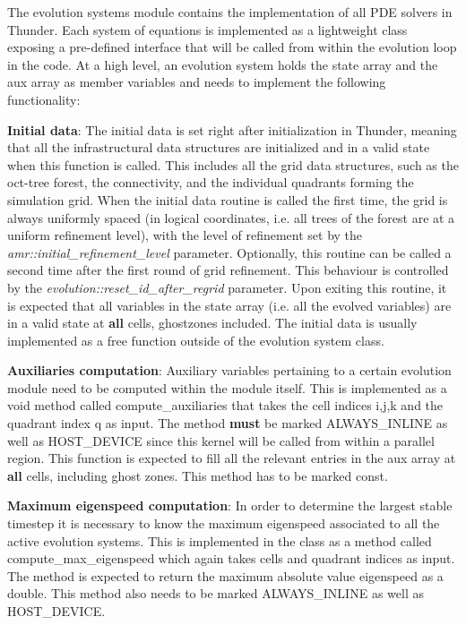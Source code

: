 The evolution systems module contains the implementation of all PDE solvers in Thunder. Each system of equations is implemented as a lightweight class exposing a pre-\/defined interface that will be called from within the evolution loop in the code. At a high level, an evolution system holds the {\ttfamily state} array and the {\ttfamily aux} array as member variables and needs to implement the following functionality\+:
\begin{DoxyItemize}
\item {\bfseries{Initial data}}\+: The initial data is set right after initialization in Thunder, meaning that all the infrastructural data structures are initialized and in a valid state when this function is called. This includes all the grid data structures, such as the oct-\/tree forest, the connectivity, and the individual quadrants forming the simulation grid. When the initial data routine is called the first time, the grid is always uniformly spaced (in logical coordinates, i.\+e. all trees of the forest are at a uniform refinement level), with the level of refinement set by the {\itshape amr\+::initial\+\_\+refinement\+\_\+level} parameter. Optionally, this routine can be called a second time after the first round of grid refinement. This behaviour is controlled by the {\itshape evolution\+::reset\+\_\+id\+\_\+after\+\_\+regrid} parameter. Upon exiting this routine, it is expected that all variables in the {\ttfamily state} array (i.\+e. all the evolved variables) are in a valid state at {\bfseries{all}} cells, ghostzones included. The initial data is usually implemented as a free function outside of the evolution system class.
\item {\bfseries{Auxiliaries computation}}\+: Auxiliary variables pertaining to a certain evolution module need to be computed within the module itself. This is implemented as a {\ttfamily void} method called {\ttfamily compute\+\_\+auxiliaries} that takes the cell indices {\ttfamily i,j,k} and the quadrant index {\ttfamily q} as input. The method {\bfseries{must}} be marked {\ttfamily ALWAYS\+\_\+\+INLINE} as well as {\ttfamily HOST\+\_\+\+DEVICE} since this kernel will be called from within a parallel region. This function is expected to fill all the relevant entries in the {\ttfamily aux} array at {\bfseries{all}} cells, including ghost zones. This method has to be marked {\ttfamily const}.
\item {\bfseries{Maximum eigenspeed computation}}\+: In order to determine the largest stable timestep it is necessary to know the maximum eigenspeed associated to all the active evolution systems. This is implemented in the class as a method called {\ttfamily compute\+\_\+max\+\_\+eigenspeed} which again takes cells and quadrant indices as input. The method is expected to return the maximum absolute value eigenspeed as a {\ttfamily double}. This method also needs to be marked {\ttfamily ALWAYS\+\_\+\+INLINE} as well as {\ttfamily HOST\+\_\+\+DEVICE}.

\end{DoxyItemize}
